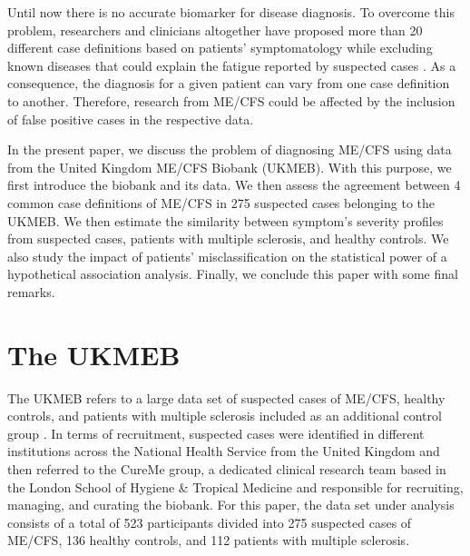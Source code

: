 Until now there is no accurate biomarker for disease diagnosis. To overcome this problem, researchers and clinicians altogether have proposed more than 20 different case definitions based on patients' symptomatology while excluding known diseases that could explain the fatigue reported by suspected cases \citep{brurberg2014CaseDefinitions}. As a consequence, the diagnosis for a given patient can vary from one case definition to another. Therefore, research from ME/CFS could be affected by the inclusion of false positive cases in the respective data. 

In the present paper, we discuss the problem of diagnosing ME/CFS using data from the United Kingdom ME/CFS Biobank (UKMEB). With this purpose, we first introduce the biobank and its data. We then assess the agreement between 4 common case definitions of ME/CFS in 275 suspected cases belonging to the UKMEB. We then estimate the similarity between symptom's severity profiles from suspected cases, patients with multiple sclerosis, and healthy controls. We also study the impact of patients' misclassification on the statistical power of a hypothetical association analysis. Finally, we conclude this paper with some final remarks. 

\section{The UKMEB}

The UKMEB refers to a large data set of suspected cases of ME/CFS, healthy controls, and patients with multiple sclerosis included as an additional control group \citep{lacerda2018UKME}. In terms of recruitment, suspected cases were identified in different institutions across the National Health Service from the United Kingdom and then referred to the CureMe group, a dedicated clinical research team based in the London School of Hygiene \& Tropical Medicine and responsible for recruiting, managing, and curating the biobank. For this paper, the data set under analysis consists of a total of 523 participants divided into 275 suspected cases of ME/CFS, 136 healthy controls, and 112 patients with multiple sclerosis. 

